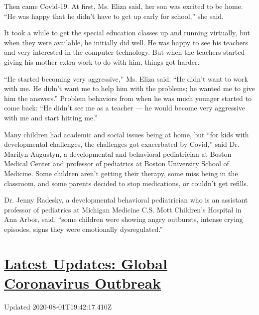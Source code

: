 Then came Covid-19. At first, Ms. Eliza said, her son was excited to be
home. ``He was happy that he didn't have to get up early for school,''
she said.

It took a while to get the special education classes up and running
virtually, but when they were available, he initially did well. He was
happy to see his teachers and very interested in the computer
technology. But when the teachers started giving his mother extra work
to do with him, things got harder.

``He started becoming very aggressive,'' Ms. Eliza said. ``He didn't
want to work with me. He didn't want me to help him with the problems;
he wanted me to give him the answers.'' Problem behaviors from when he
was much younger started to come back: ``He didn't see me as a teacher
--- he would become very aggressive with me and start hitting me.''

Many children had academic and social issues being at home, but ``for
kids with developmental challenges, the challenges got exacerbated by
Covid,'' said Dr. Marilyn Augustyn, a developmental and behavioral
pediatrician at Boston Medical Center and professor of pediatrics at
Boston University School of Medicine. Some children aren't getting their
therapy, some miss being in the classroom, and some parents decided to
stop medications, or couldn't get refills.

Dr. Jenny Radesky, a developmental behavioral pediatrician who is an
assistant professor of pediatrics at Michigan Medicine C.S. Mott
Children's Hospital in Ann Arbor, said, ``some children were showing
angry outbursts, intense crying episodes, signs they were emotionally
dysregulated.''

\hypertarget{latest-updates-global-coronavirus-outbreak}{%
\section{\texorpdfstring{\href{https://www.nytimes3xbfgragh.onion/2020/08/01/world/coronavirus-covid-19.html?action=click\&pgtype=Article\&state=default\&region=MAIN_CONTENT_1\&context=storylines_live_updates}{Latest
Updates: Global Coronavirus
Outbreak}}{Latest Updates: Global Coronavirus Outbreak}}\label{latest-updates-global-coronavirus-outbreak}}

Updated 2020-08-01T19:42:17.410Z

